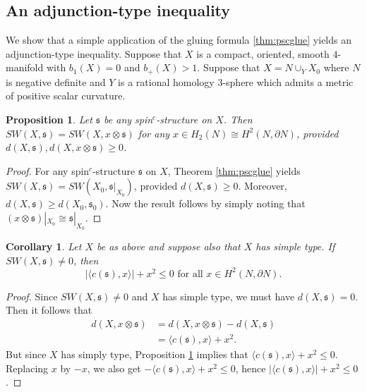 \documentclass{amsart}
\newtheorem{corollary}[theorem]{Corollary}
\newtheorem{proposition}[theorem]{Proposition}
\theoremstyle{definition}
\theoremstyle{remark}
\numberwithin{equation}{section}
\begin{document}
\subsection{An adjunction-type inequality}

We show that a simple application of the gluing formula \ref{thm:pscglue} yields an adjunction-type inequality. Suppose that $X$ is a compact, oriented, smooth $4$-manifold with $b_1(X) = 0$ and $b_+(X) > 1$. Suppose that $X = N \cup_Y X_0$ where $N$ is negative definite and $Y$ is a rational homology $3$-sphere which admits a metric of positive scalar curvature. 

\begin{proposition}\label{prop:switch}
Let $\mathfrak{s}$ be any spin$^c$-structure on $X$. Then $SW(X,\mathfrak{s}) = SW(X , x \otimes \mathfrak{s})$ for any $x \in H_2(N) \cong H^2(N,\partial N)$, provided $d(X,\mathfrak{s}), d(X , x \otimes \mathfrak{s}) \ge 0$.
\end{proposition}
\begin{proof}
For any spin$^c$-structure $\mathfrak{s}$ on $X$, Theorem \ref{thm:pscglue} yields $SW(X,\mathfrak{s}) = SW(X_0 , \mathfrak{s}|_{X_0})$, provided $d(X , \mathfrak{s} ) \ge 0$. Moreover, $d(X,\mathfrak{s}) \ge d(X_0 , \mathfrak{s}_0)$. Now the result follows by simply noting that $( x \otimes \mathfrak{s} )|_{X_0} \cong \mathfrak{s}|_{X_0}$.
\end{proof}

\begin{corollary}
Let $X$ be as above and suppose also that $X$ has simple type. If $SW(X , \mathfrak{s}) \neq 0$, then
\[
|\langle c(\mathfrak{s}) , x \rangle | + x^2 \le 0 \text{ for all } x \in H^2(N,\partial N). 
\]
\end{corollary}
\begin{proof}
Since $SW(X , \mathfrak{s}) \neq 0$ and $X$ has simple type, we must have $d(X , \mathfrak{s}) = 0$. Then it follows that
\begin{align*}
d(X , x \otimes \mathfrak{s}) &= d(X , x \otimes \mathfrak{s}) - d(X,\mathfrak{s}) \\
&= \langle c(\mathfrak{s}) , x \rangle + x^2.
\end{align*}
But since $X$ has simply type, Proposition \ref{prop:switch} implies that $\langle c(\mathfrak{s}) , x \rangle + x^2 \le 0$. Replacing $x$ by $-x$, we also get $-\langle c(\mathfrak{s}) , x \rangle + x^2 \le 0$, hence $|\langle c(\mathfrak{s}) , x \rangle | + x^2 \le 0$.
\end{proof}
\end{document}
